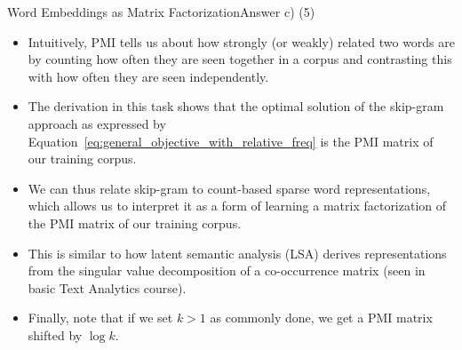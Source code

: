 \documentclass[t]{beamer}
\begin{document}
\begin{frame}{Word Embeddings as Matrix Factorization}{Answer c) (5)}
    \begin{itemize}
        \item Intuitively, PMI tells us about how strongly (or weakly) related
              two words are by counting how often they are seen together in a
              corpus and contrasting this with how often they are seen
              independently.
        \item The derivation in this task shows that the optimal solution of the
              skip-gram approach as expressed by
              Equation~\ref{eq:general_objective_with_relative_freq} is the PMI
              matrix of our training corpus.
        \item We can thus relate skip-gram to count-based sparse word
              representations, which allows us to interpret it as a form of
              learning a matrix factorization of the PMI matrix of our training
              corpus.
        \item This is similar to how latent semantic analysis (LSA) derives
              representations from the singular value decomposition of a
              co-occurrence matrix (seen in basic Text Analytics course).
        \item Finally, note that if we set $k > 1$ as commonly done, we get a
              PMI matrix shifted by $\log k$.
    \end{itemize}
\end{frame}
\end{document}
